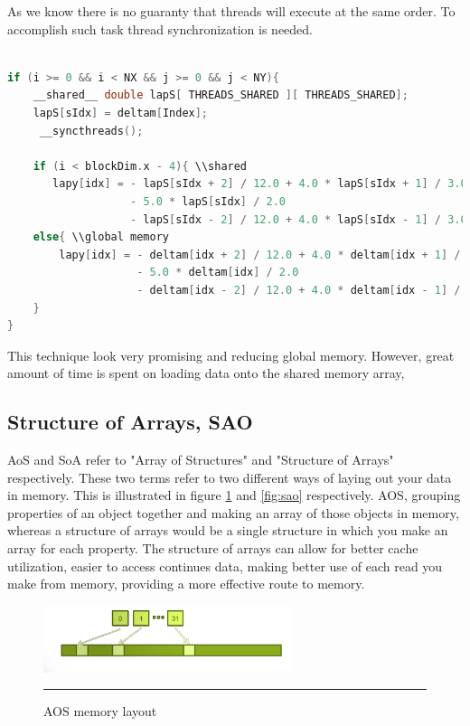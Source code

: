 As we know there is no guaranty that threads will execute at the same order. To accomplish such task thread synchronization is needed.



\begin{lstlisting}[language=C++, label={lst:consingle}, caption={Evaluation of individual coordinates of the Zhang and Li model}]

if (i >= 0 && i < NX && j >= 0 && j < NY){
    __shared__ double lapS[ THREADS_SHARED ][ THREADS_SHARED];
    lapS[sIdx] = deltam[Index];
     __syncthreads();

    if (i < blockDim.x - 4){ \\shared
       lapy[idx] = - lapS[sIdx + 2] / 12.0 + 4.0 * lapS[sIdx + 1] / 3.0
			  	   - 5.0 * lapS[sIdx] / 2.0
			  	   - lapS[sIdx - 2] / 12.0 + 4.0 * lapS[sIdx - 1] / 3.0;
	else{ \\global memory
		lapy[idx] = - deltam[idx + 2] / 12.0 + 4.0 * deltam[idx + 1] / 3.0
			  		- 5.0 * deltam[idx] / 2.0
			  		- deltam[idx - 2] / 12.0 + 4.0 * deltam[idx - 1] / 3.0;
	}
}
\end{lstlisting}

This technique look very promising and reducing global memory. However, great amount of time is spent on loading data onto the shared memory array,

\subsection{Structure of Arrays, SAO}

AoS and SoA refer to "Array of Structures" and "Structure of Arrays" respectively. These two terms refer to two different ways of laying out your data in memory. This is illustrated in figure \ref{fig:aos} and \ref{fig:sao} respectively. AOS, grouping properties of an object together and making an array of those objects in memory, whereas a structure of arrays would be a single structure in which you make an array for each property. The structure of arrays can allow for better cache utilization, easier to access continues data, making better use of each read you make from memory, providing a more effective route to memory. 

\begin{figure}[htbp]
	\centering
		\includegraphics[width=0.65\textwidth]{Figures/aos.png}
		\rule{35em}{0.2pt}
	\caption[Array of structures (AOS)]{AOS memory layout }
	\label{fig:aos}
\end{figure}


